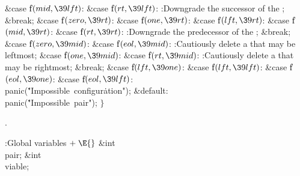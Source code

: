 \&{case} \|f${}(\\{mid},\39\\{lft}){}$:\5
\&{case} \|f${}(\\{rt},\39\\{lft}){}$:\5
:Downgrade the successor of the \X;\5
\&{break};\6
\4\&{case} \|f${}(\\{zero},\39\\{rt}){}$:\5
\&{case} \|f${}(\\{one},\39\\{rt}){}$:\5
\&{case} \|f${}(\\{lft},\39\\{rt}){}$:\5
\&{case} \|f${}(\\{mid},\39\\{rt}){}$:\5
\&{case} \|f${}(\\{rt},\39\\{rt}){}$:\5
:Downgrade the predecessor of the \X;\5
\&{break};\6
\4\&{case} \|f${}(\\{zero},\39\\{mid}){}$:\5
\&{case} \|f${}(\\{eol},\39\\{mid}){}$:\5
:Cautiously delete a  that may be leftmost\X;\6
\4\&{case} \|f${}(\\{one},\39\\{mid}){}$:\5
\&{case} \|f${}(\\{rt},\39\\{mid}){}$:\5
:Cautiously delete a  that may be rightmost\X;\6
\&{break};\6
\4\&{case} \|f${}(\\{lft},\39\\{one}){}$:\5
\&{case} \|f${}(\\{lft},\39\\{lft}){}$:\5
\&{case} \|f${}(\\{eol},\39\\{one}){}$:\5
\&{case} \|f${}(\\{eol},\39\\{lft}){}$:\5
\\{panic}(\.{"Impossible\ configur}\)\.{ation"});\6
\4\&{default}:\5
\\{panic}(\.{"Impossible\ pair"});\6
\4${}\}{}$\2\par
{}.\fi

\B{}:Global variables\X${}\mathrel+\E{}$\6
\&{int} \\{pair};\6
\&{int} \\{viable};\par
\fi

